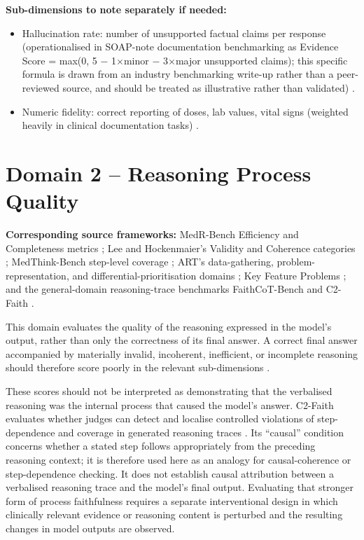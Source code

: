 \documentclass{article}
\begin{document}
\textbf{Sub-dimensions to note separately if needed:}
\begin{itemize}
\item Hallucination rate: number of unsupported factual claims per response (operationalised in SOAP-note documentation benchmarking as Evidence Score = max(0, 5 $-$ 1$\times$minor $-$ 3$\times$major unsupported claims); this specific formula is drawn from an industry benchmarking write-up rather than a peer-reviewed source, and should be treated as illustrative rather than validated) \cite{omihealth2026soap}.
\item Numeric fidelity: correct reporting of doses, lab values, vital signs (weighted heavily in clinical documentation tasks) \cite{omihealth2026soap}.
\end{itemize}

\section{Domain 2 -- Reasoning Process Quality}

\textbf{Corresponding source frameworks:}
MedR-Bench Efficiency and Completeness metrics
\cite{qiu2025medrbench};
Lee and Hockenmaier's Validity and Coherence categories
\cite{lee2025survey};
MedThink-Bench step-level coverage
\cite{zhou2026medthinkbench};
ART's data-gathering, problem-representation, and
differential-prioritisation domains
\cite{thammasitboon2018art};
Key Feature Problems
\cite{page1995kfp};
and the general-domain reasoning-trace benchmarks
FaithCoT-Bench and C2-Faith
\cite{shen2025faithcotbench,mittal2026c2faith}.

This domain evaluates the quality of the reasoning expressed in the
model's output, rather than only the correctness of its final answer.
A correct final answer accompanied by materially invalid, incoherent,
inefficient, or incomplete reasoning should therefore score poorly
in the relevant sub-dimensions
\cite{qiu2025medrbench,zhou2026medthinkbench}.

These scores should not be interpreted as demonstrating that the
verbalised reasoning was the internal process that caused the model's
answer. C2-Faith evaluates whether judges can detect and localise
controlled violations of step-dependence and coverage in generated
reasoning traces \cite{mittal2026c2faith}. Its ``causal'' condition
concerns whether a stated step follows appropriately from the preceding
reasoning context; it is therefore used here as an analogy for
causal-coherence or step-dependence checking. It does not establish
causal attribution between a verbalised reasoning trace and the model's
final output. Evaluating that stronger form of process faithfulness
requires a separate interventional design in which clinically relevant
evidence or reasoning content is perturbed and the resulting changes in
model outputs are observed.
\end{document}
